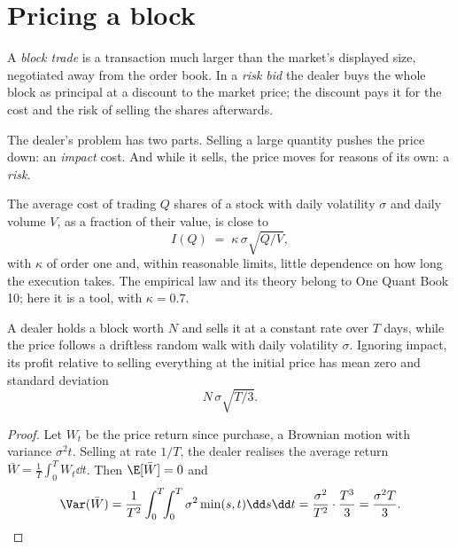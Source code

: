 \section{Pricing a block}

\begin{definition}\label{def:m1:the-sell-side:block}
A \emph{block trade} is a transaction much larger than the
market's displayed size, negotiated away from the order book. In a
\emph{risk bid} the dealer buys the whole block as principal at a discount
to the market price; the discount pays it for the cost and the risk of
selling the shares afterwards.
\end{definition}

The dealer's problem has two parts. Selling a large quantity pushes the price
down: an \emph{impact} cost. And while it sells, the price moves for reasons
of its own: a \emph{risk}.

\begin{method}\label{met:m1:the-sell-side:sqrt}
The average cost of trading $Q$ shares of a stock with daily volatility
$\sigma$ and daily volume $V$, as a fraction of their value, is close to
\[
  I(Q) \;=\; \kappa\,\sigma\sqrt{Q/V},
\]
with $\kappa$ of order one and, within reasonable limits, little dependence
on how long the execution takes. The empirical law and its theory belong to
One Quant Book 10; here it is a tool, with $\kappa = 0.7$.
\end{method}

\begin{proposition}\label{prop:m1:the-sell-side:tover3}
A dealer holds a block worth $N$ and sells it at a constant rate over $T$
days, while the price follows a driftless random walk with daily volatility
$\sigma$. Ignoring impact, its profit relative to selling everything at the
initial price has mean zero and standard deviation
\[
  N\,\sigma\sqrt{T/3}.
\]
\end{proposition}
\begin{proof}
Let $W_t$ be the price return since purchase, a Brownian motion with
variance $\sigma^2 t$. Selling at rate $1/T$, the dealer realises the average
return $\bar W = \frac1T\int_0^T W_t\dd t$. Then $\E[\bar W]=0$ and
\[
\Var(\bar W) = \frac{1}{T^2}\int_0^T\!\!\int_0^T \sigma^2 \min(s,t)\dd s\dd t
 = \frac{\sigma^2}{T^2}\cdot\frac{T^3}{3} = \frac{\sigma^2 T}{3}.
\qedhere
\]
\end{proof}

